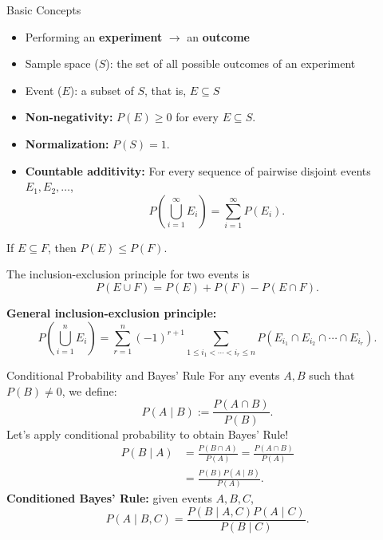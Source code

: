 \documentclass[aspectratio=169,12pt]{beamer}
\begin{document}
\begin{frame}[t]{Basic Concepts}
	\vspace{-0.10cm}
	
	{\small
		\begin{itemize}
			\setlength{\itemsep}{0.12cm}
			\item Performing an \textbf{experiment}
			$\longrightarrow$ an \textbf{outcome}
			\item Sample space ($S$): the set of all possible outcomes
			of an experiment
			\item Event ($E$): a subset of $S$, that is, $E\subseteq S$
		\end{itemize}
		
		\vspace{0.28cm}
		
		\begin{itemize}
			\setlength{\itemsep}{0.12cm}
			
			\item \textbf{Non-negativity:}
			$P(E)\geq 0$ for every $E\subseteq S$.
			
			\item \textbf{Normalization:}
			$P(S)=1$.
			
			\item \textbf{Countable additivity:}
			For every sequence of pairwise disjoint events
			$E_1,E_2,\ldots$,
			\[
			P\left(\bigcup_{i=1}^{\infty}E_i\right)
			=
			\sum_{i=1}^{\infty}P(E_i).
			\]
		\end{itemize}
	}
\end{frame}

\begin{frame}
	If $E\subseteq F$, then $
P(E)\leq P(F).$

The inclusion-exclusion principle for two events is
\[
P(E\cup F)
=
P(E)+P(F)-P(E\cap F).
\]
\vspace{0.15cm}

\textbf{General inclusion-exclusion principle:}
\[
P\left(\bigcup_{i=1}^{n}E_i\right)
=
\sum_{r=1}^{n}(-1)^{r+1}
\sum_{1\leq i_1<\cdots<i_r\leq n}
P\left(
E_{i_1}\cap E_{i_2}\cap\cdots\cap E_{i_r}
\right).
\]



\end{frame}


\begin{frame}[t]{Conditional Probability and Bayes' Rule}
  \vspace{-0.12cm}
  {\scriptsize
  For any events $A,B$ such that $P(B)\ne0$, we define:
  \[
    P(A\mid B):=\frac{P(A\cap B)}{P(B)}.
  \]
  Let's apply conditional probability to obtain Bayes' Rule!
  \[
  \begin{aligned}
    P(B\mid A)
      &=\frac{P(B\cap A)}{P(A)}
       =\frac{P(A\cap B)}{P(A)}\\
      &=\boxed{\frac{P(B)P(A\mid B)}{P(A)}}.
  \end{aligned}
  \]
  \textbf{Conditioned Bayes' Rule:} given events $A,B,C$,
  \[
    P(A\mid B,C)=\frac{P(B\mid A,C)P(A\mid C)}{P(B\mid C)}.
  \]
  }
\end{frame}
\end{document}
